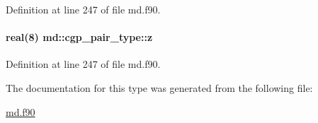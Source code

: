 Definition at line 247 of file md.\-f90.

\hypertarget{structmd_1_1cgp__pair__type_a2228c355b34275a84b6ab7ccf60ed01e}{
\paragraph[{z}]{\setlength{\rightskip}{0pt plus 5cm}real(8) md\-::cgp\-\_\-pair\-\_\-type\-::z}}\label{structmd_1_1cgp__pair__type_a2228c355b34275a84b6ab7ccf60ed01e}


Definition at line 247 of file md.\-f90.



The documentation for this type was generated from the following file\-:\begin{DoxyCompactItemize}
\item 
\hyperlink{md_8f90}{md.\-f90}\end{DoxyCompactItemize}
